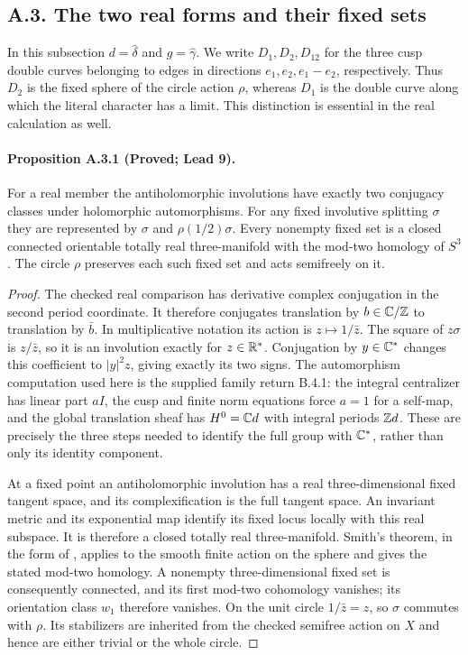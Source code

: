 \subsection{A.3. The two real forms and their fixed sets}

In this subsection $d=\widehat\delta$ and $g=\widehat\gamma$.
We write $D_1,D_2,D_{12}$ for the three cusp double curves belonging to
edges in directions $e_1,e_2,e_1-e_2$, respectively. Thus $D_2$ is the
fixed sphere of the circle action $\rho$, whereas $D_1$ is the double
curve along which the literal character has a limit. This distinction
is essential in the real calculation as well.

\paragraph{Proposition A.3.1 (Proved; Lead 9).}
For a real member the antiholomorphic involutions have exactly two
conjugacy classes under holomorphic automorphisms. For any fixed
involutive splitting $\sigma$ they are represented by $\sigma$ and
$\rho(1/2)\sigma$. Every nonempty fixed set is a closed connected
orientable totally real three-manifold with the mod-two homology of
$S^3$. The circle $\rho$ preserves each such fixed set and acts
semifreely on it.

\begin{proof}
The checked real comparison has derivative complex conjugation in the
second period coordinate. It therefore conjugates translation by
$b\in\mathbb C/\mathbb Z$ to translation by $\bar b$. In multiplicative notation its
action is $z\mapsto1/\bar z$. The square of $z\sigma$ is $z/\bar z$,
so it is an involution exactly for $z\in\mathbb R^*$. Conjugation by $y\in\mathbb C^*$
changes this coefficient to $|y|^2z$, giving exactly its two signs.
The automorphism computation used here is the supplied family return
B.4.1: the integral centralizer has linear part $aI$, the cusp and
finite norm equations force $a=1$ for a self-map, and the global
translation sheaf has $H^0=\mathbb C d$ with integral periods $\mathbb Z d$.
These are precisely the three steps needed to identify the full group
with $\mathbb C^*$, rather than only its identity component.

At a fixed point an antiholomorphic involution has a real three-dimensional
fixed tangent space, and its complexification is the full tangent space.
An invariant metric and its exponential map identify its fixed locus
locally with this real subspace. It is therefore a closed totally real
three-manifold. Smith's theorem, in the form of
\cite[Theorem 4.1(1)]{Knudson2004}, applies to the smooth finite action on
the sphere and gives the stated mod-two homology. A nonempty
three-dimensional fixed set is consequently connected, and its first
mod-two cohomology vanishes; its orientation class $w_1$ therefore
vanishes. On the unit circle $1/\bar z=z$, so $\sigma$ commutes with
$\rho$. Its stabilizers are inherited from the checked semifree action
on $X$ and hence are either trivial or the whole circle.
\end{proof}

